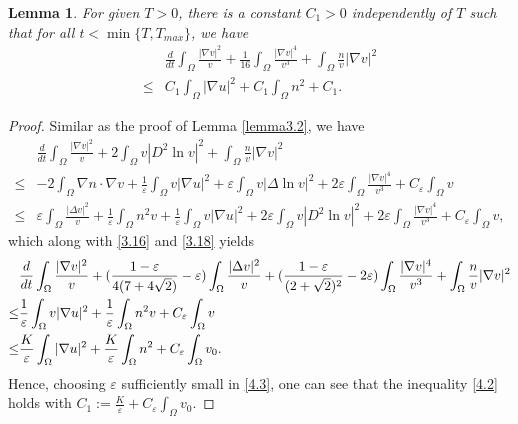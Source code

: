 \documentclass[12pt]{article}
\theoremstyle{plain}
\newtheorem{lemma}{Lemma}[section]
\theoremstyle{definition}
\numberwithin{equation}{section}
\begin{document}
\begin{lemma}\label{lemma4.2}For given $T>0$, there is a constant $C_1>0$ independently of $T$ such that  for all $t<\min\{T,T_{max}\}$, we have
 \begin{equation}\label{4.2}
\begin{split}
&\frac d{dt} \int_\Omega  \frac{|\nabla v|^2}v
+\frac1 {16}\int_\Omega \frac{|\nabla v|^4}{v^3}+ \int_\Omega \frac nv |\nabla v|^2\\
\leq & C_1
\int_\Omega |\nabla u|^2+ C_1\int_\Omega  {n^2}+
C_1.
\end{split}
\end{equation}
\end{lemma}
\begin{proof}[Proof]Similar as the proof of Lemma \ref{lemma3.2}, we have
\begin{equation*}
\begin{split}
&\frac d{dt} \int_\Omega  \frac{|\nabla v|^2}v
+2\int_\Omega v|D^2\ln v|^2+ \int_\Omega \frac nv |\nabla v|^2\\
\leq & -2\int_\Omega \nabla n\cdot\nabla v+  \frac1{\varepsilon}
\int_\Omega v |\nabla u|^2+\varepsilon\int_\Omega v|\Delta\ln v|^2+
2\varepsilon
\int_\Omega \frac{|\nabla v|^4}{v^3}+C_\varepsilon\int_{\Omega}v
\\
\leq & \varepsilon \int_\Omega \frac {|\Delta v|^2}v+
\frac 1{\varepsilon} \int_\Omega  {n^2}v
 +\frac1{\varepsilon}
\int_\Omega v |\nabla u|^2+2\varepsilon\int_\Omega v|D^2\ln v|^2+
2\varepsilon
\int_\Omega \frac{|\nabla v|^4}{v^3}+C_\varepsilon\int_{\Omega}v,
\end{split}
\end{equation*}
which along  with \eqref{3.16} and \eqref{3.18} yields
\begin{align}\label{4.3}
&\frac d{dt} \int_\Omega  \frac{|\nabla v|^2}v
+(\frac {1-\varepsilon} {4(7 + 4\sqrt{2})}-\varepsilon)  \int_\Omega \frac {|\Delta v|^2}v
+(\frac {1-\varepsilon} {(2 + \sqrt{2})^2}-2\varepsilon)
\int_\Omega \frac{|\nabla v|^4}{v^3}+ \int_\Omega \frac nv |\nabla v|^2 \notag\\
\leq & \frac1{\varepsilon}
\int_\Omega v |\nabla u|^2+  \frac 1{\varepsilon} \int_\Omega  {n^2}v+
C_\varepsilon\int_{\Omega}v\\
\leq & \frac K {\varepsilon}
\int_\Omega |\nabla u|^2+  \frac K {\varepsilon} \int_\Omega  {n^2}+
C_\varepsilon\int_{\Omega}v_0. \notag
\end{align}
Hence, choosing $\varepsilon$ sufficiently small in \eqref{4.3}, one can see that the inequality \eqref{4.2}  holds with $C_1:=
\frac K {\varepsilon}+ C_\varepsilon\int_{\Omega}v_0$.
\end{proof}
\end{document}
